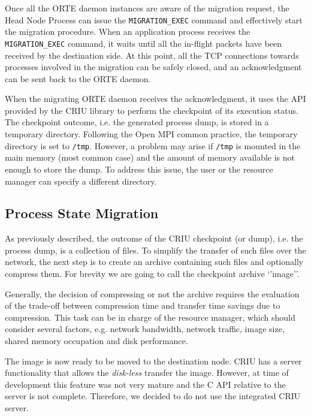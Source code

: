 Once all the ORTE daemon instances are aware of the migration request, the
Head Node Process
can issue the \linebreak \texttt{MIGRATION\_EXEC} command and effectively start the
migration procedure. When an application process receives the \texttt
{MIGRATION\_EXEC} command, it waits until all the in-flight packets have been
received by the destination side. At this point, all the TCP connections towards
processes involved in the migration can be safely closed, and an acknowledgment
can be sent back to the ORTE daemon.

When the migrating ORTE daemon receives the acknowledgment, it uses the API
provided by the CRIU library to perform the checkpoint of its execution status.
The checkpoint outcome, i.e. the generated process dump, is stored
in a temporary directory. Following the Open MPI common practice, the temporary
directory is set to \texttt{/tmp}. However, a problem may arise if \texttt{/tmp}
is mounted in the main memory (most common case) and the amount of memory
available is not enough to store the dump. To address this issue, the user or
the resource manager can specify a different directory.


\subsection{Process State Migration}

As previously described, the outcome of the CRIU checkpoint (or dump), i.e. the
process dump, is a collection of files. To simplify the transfer of such files
over the network, the next step is to create an archive containing such files
and optionally compress them. For brevity we are going to call the checkpoint
archive `'image''.

Generally, the decision of compressing or not the archive requires the
evaluation of the trade-off between compression time and transfer time savings
due to compression. This task can be in charge of the resource manager, which
should consider several factors, e.g. network bandwidth, network traffic, image
size, shared memory occupation and disk
performance.

The image is now ready to be moved to the destination node.
CRIU has a server functionality that allows the \emph{disk-less} transfer
the image.
However, at time of development this feature was not very mature and the C API
relative to the server is not complete. Therefore, we decided to do not use
the integrated CRIU server.

